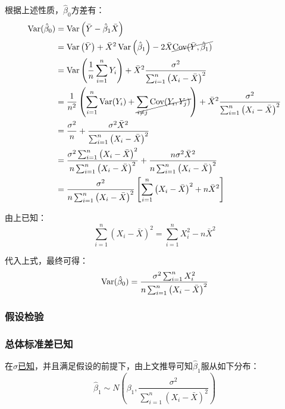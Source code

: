 \documentclass[11pt]{article}
\begin{document}
\begin{property}
    根据上述性质，$\hat{\beta}_0$方差有：
    \begin{align*}
        \operatorname{Var}(\hat{\beta}_0) 
        &= \operatorname{Var}\left( \bar{Y} - \hat{\beta}_1 \bar{X} \right) \\
        &= \operatorname{Var} \left(\bar{Y}\right) + \bar{X}^2 \operatorname{Var}\left( \hat{\beta}_1 \right) - 2\bar{X} \cancel{\operatorname{Cov}(\bar{Y},\hat{\beta}_1)} \\
        &= \operatorname{Var}\left( \frac{1}{n} \sum_{i=1}^{n} Y_i \right) + \bar{X}^2 \frac{\sigma^2}{\sum_{i=1}^{n} \left(X_i - \bar{X}\right)^2} \\
        &= \frac{1}{n^2} \left(\sum_{i=1}^{n} \operatorname{Var}(Y_i) + \cancel{\sum_{i \neq j} \operatorname{Cov}(Y_i,Y_j)}\right) + \bar{X}^2 \frac{\sigma^2}{\sum_{i=1}^{n} \left(X_i - \bar{X}\right)^2} \\
        &= \frac{\sigma^2}{n} + \frac{\sigma^2 \bar{X}^2}{\sum_{i=1}^{n} \left(X_i - \bar{X}\right)^2} \\
        &= \frac{\sigma^2 \sum_{i=1}^{n} \left(X_i - \bar{X}\right)^2}{n \sum_{i=1}^{n} \left(X_i - \bar{X}\right)^2}
        + \frac{n \sigma^2 \bar{X}^2}{n \sum_{i=1}^{n} \left(X_i - \bar{X}\right)^2} \\
        &= \frac{\sigma^2}{n \sum_{i=1}^{n} \left(X_i - \bar{X}\right)^2} \left[ \sum_{i=1}^{n} \left(X_i - \bar{X}\right)^2 + n\bar{X}^2 \right]
    \end{align*}

    由上已知：
    \begin{equation*}
        \sum_{i=1}^{n} \left(X_i - \bar{X}\right)^2
        = \sum_{i=1}^{n} X_i^2 - n \bar{X}^2 
    \end{equation*}

    代入上式，最终可得：
    \begin{equation*}
        \operatorname{Var}(\hat{\beta}_0)
        = \frac{\sigma^2 \sum_{i=1}^{n} X_i^2}{n \sum_{i=1}^{n} \left(X_i - \bar{X}\right)^2}
    \end{equation*}
\end{property}

\subsubsection{假设检验}

\subsubsection*{总体标准差已知}

在$\sigma$\uline{已知}，并且满足假设的前提下，由上文推导可知$\hat{\beta}_1$服从如下分布：
\begin{equation*}
    \hat{\beta}_1 \sim N\left( \beta_1, \frac{\sigma^2}{\sum_{i=1}^{n} \left(X_i - \bar{X}\right)^2} \right)
\end{equation*}
\end{document}
